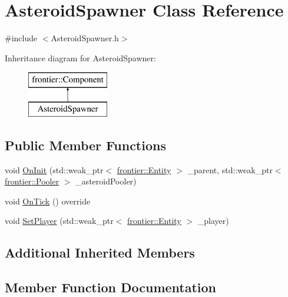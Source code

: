 \hypertarget{class_asteroid_spawner}{}\section{Asteroid\+Spawner Class Reference}
\label{class_asteroid_spawner}


{\ttfamily \#include $<$Asteroid\+Spawner.\+h$>$}

Inheritance diagram for Asteroid\+Spawner\+:\begin{figure}[H]
\begin{center}
\leavevmode
\includegraphics[height=2.000000cm]{class_asteroid_spawner}
\end{center}
\end{figure}
\subsection*{Public Member Functions}
\begin{DoxyCompactItemize}
\item 
void \hyperlink{class_asteroid_spawner_a55785f3beb7478604241becaacb266a3}{On\+Init} (std\+::weak\+\_\+ptr$<$ \hyperlink{classfrontier_1_1_entity}{frontier\+::\+Entity} $>$ \+\_\+parent, std\+::weak\+\_\+ptr$<$ \hyperlink{classfrontier_1_1_pooler}{frontier\+::\+Pooler} $>$ \+\_\+asteroid\+Pooler)
\item 
void \hyperlink{class_asteroid_spawner_acd2744a9a1ac8f13ac28220b33b9f750}{On\+Tick} () override
\item 
void \hyperlink{class_asteroid_spawner_a4ba8146f631d20b3f293f05cb6542da5}{Set\+Player} (std\+::weak\+\_\+ptr$<$ \hyperlink{classfrontier_1_1_entity}{frontier\+::\+Entity} $>$ \+\_\+player)
\end{DoxyCompactItemize}
\subsection*{Additional Inherited Members}


\subsection{Member Function Documentation}
\mbox{\label{class_asteroid_spawner_a55785f3beb7478604241becaacb266a3}} 
